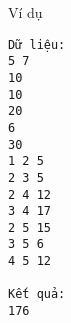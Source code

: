Ví dụ
\begin{verbatim}
Dữ liệu:
5 7
10
10
20
6
30
1 2 5
2 3 5
2 4 12
3 4 17
2 5 15
3 5 6
4 5 12

Kết quả:
176
\end{verbatim}